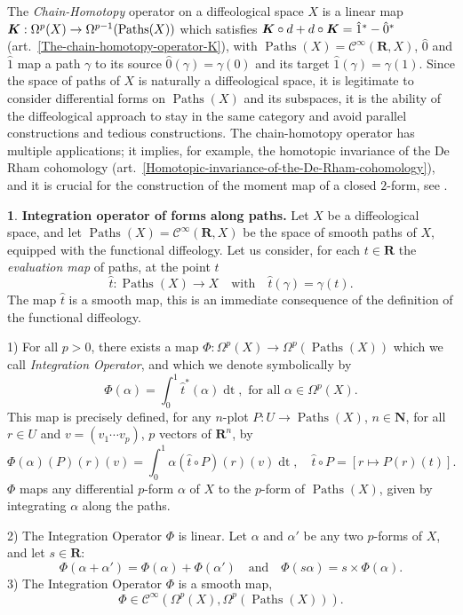 \documentclass[11pt,reqno]{amsart}
\theoremstyle{definition}
\newtheorem{article}{}
\newcommand{\artlabel}[1]{{\bf #1.}}
\newcommand{\qmbox}[1]{\quad \mbox{#1}\quad}
\newcommand{\NN}{{\mathbf N}}
\newcommand{\RR}{{\mathbf R}}
\def \P{{P}}
\def \U{{U}}
\def \X{{X}}
\newcommand{\cC}{{\mathcal C}}
\newcommand{\eK}{\mbox{\boldmath $K$}}
\newcommand{\art}[1]{{(art.~\ref{#1})}}
\newcommand{\DForms}{\Omega}
\newcommand{\Paths}{\operatorname{Paths}}
\newcommand{\source}{\hat 0}
\newcommand{\but}{\hat 1}
\newcommand{\Cinf}{{\cC}^\infty}
\newcommand{\dt}{\operatorname{dt}}
\begin{document}
  \begin{text}
    The  {\em Chain-Homotopy\/} operator on a diffeological
    space $\X$ is a linear map $\eK : \DForms^p(\X) \to
      \DForms^{p-1}(\Paths(\X))$ which satisfies 
    $\eK \circ d  + d \circ \eK = \but^* -\source^*$
    \art{The-chain-homotopy-operator-K}, with $\Paths(\X) =
      \Cinf(\RR,\X)$, $\source$ and $\but$ map a path
    $\gamma$ to its source $\source(\gamma) = \gamma(0)$ and
    its target $\but(\gamma) = \gamma(1)$. Since the space
    of paths of $\X$ is naturally a diffeological space, it is
    legitimate to consider differential forms on $\Paths(\X)$
    and its subspaces, it is the ability of the
    diffeological approach to stay in the same category and
    avoid parallel constructions and tedious
    constructions. The chain-homotopy operator has multiple
    applications; it implies, for example, the homotopic
    invariance of the De Rham cohomology
    \art{Homotopic-invariance-of-the-De-Rham-cohomology}, and
    it is crucial for the construction of the moment map of a
    closed $2$-form, see \cite{Piz07}.
  \end{text}
  
  \begin{article}\artlabel{Integration operator of forms along paths} 
    \label{Integration-operator-of-forms-along-paths}
    Let $\X$ be a diffeological space, and let $\Paths(\X) = 
      \Cinf(\RR,\X)$ be the space of smooth paths of $\X$,
    equipped with the functional diffeology. Let us consider,
    for each $t \in \RR$ the {\em evaluation map} of paths,
    at the point $t$
    $$
      {\hat t}: \Paths(\X) \to \X \quad
      \mbox{with} \quad {\hat t}(\gamma) = \gamma(t).
      $$ 
    The map ${\hat t}$ is a smooth map, this is an immediate
    consequence of the definition of the functional
    diffeology. 
    
    1) For all $p>0$, there exists a map $\Phi : \DForms^p(\X)
      \to \DForms^p(\Paths(\X))$ which we call {\em Integration Operator},
      and which we denote symbolically by
    $$ 
      \Phi(\alpha) = \int_0^1 {\hat t}^*(\alpha) \dt,
      \mbox{ for all } \alpha \in  \DForms^p(\X).
      $$ 
    This map is precisely defined, 
    for any $n$-plot $\P: \U \to \Paths(\X)$, $n \in \NN$, for all $r \in \U$ and $v =
      (v_1 \cdots v_p)$, $p$ vectors of
    $\RR^n$, by
    $$ \Phi(\alpha)(\P)(r)(v) =
      \int_0^1\alpha({\hat t} \circ \P)(r)(v) \dt,
      \quad {\hat t}
      \circ \P = [r \mapsto \P(r)(t)].
      $$ 
     $\Phi$ maps any differential $p$-form
    $\alpha$ of $\X$ to the $p$-form of $\Paths(\X)$,
    given by integrating $\alpha$ along the paths.

    2) The Integration Operator $\Phi$ is linear. Let
    $\alpha$ and $\alpha'$ be any two $p$-forms of $\X$, and
    let $s \in \RR$: 
    $$
      \Phi(\alpha+\alpha') = \Phi(\alpha) +
      \Phi(\alpha') \qmbox{and} \Phi(s\alpha) = s\times
      \Phi(\alpha).
      $$
    3) The Integration Operator
    $\Phi$ is a smooth map,
    $$\Phi \in \Cinf(\Omega^p(\X),\Omega^p(\Paths(\X))).$$
  \end{article} %
  
\end{document}
